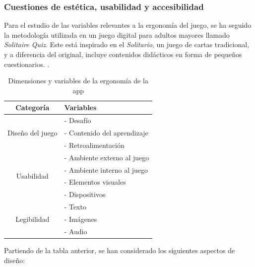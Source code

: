 \subsubsection{Cuestiones de estética, usabilidad y accesibilidad}

Para el estudio de las variables relevantes a la ergonomía del juego, se ha seguido la metodología utilizada en un juego digital para adultos mayores llamado \textit{Solitaire Quiz}. Este está inspirado en el \textit{Solitario}, un juego de cartas tradicional, y a diferencia del original, incluye contenidos didácticos en forma de pequeños cuestionarios. \parencite{diseño2017}.

\begin{table}[H]
	\centering
	\begin{tabular}{|c|p{6cm}|}
		\hline
		\rowcolor{lightgray}
		\textbf{Categoría} & \textbf{Variables}\\
		\hline
		\multirow{3}{*}{Diseño del juego} & - Desafío \\
		& - Contenido del aprendizaje \\
		& - Retroalimentación \\
		\hline
		\multirow{4}{*}{Usabilidad} & - Ambiente externo al juego \\
		& - Ambiente interno al juego \\
		& - Elementos visuales \\
		& - Dispositivos \\
		\hline
		\multirow{3}{*}{Legibilidad} & - Texto \\
		& - Imágenes \\
		& - Audio \\
		\hline
	\end{tabular}
	\caption{Dimensiones y variables de la ergonomía de la app}
	\label{tab:usabilidad}
\end{table}

Partiendo de la tabla anterior, se han considerado los siguientes aspectos de diseño:

